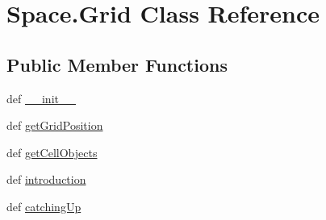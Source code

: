 \hypertarget{classSpace_1_1Grid}{\section{\-Space.\-Grid \-Class \-Reference}
\label{classSpace_1_1Grid}
}
\subsection*{\-Public \-Member \-Functions}
\begin{DoxyCompactItemize}
\item 
def \hyperlink{classSpace_1_1Grid_a685e4522685becf245a520a6e669509f}{\-\_\-\-\_\-init\-\_\-\-\_\-}
\item 
def \hyperlink{classSpace_1_1Grid_afd730a4c95125ce048ddebc1105deddb}{get\-Grid\-Position}
\item 
def \hyperlink{classSpace_1_1Grid_a5bd13dd073fa6572ec88e9ed77667a8c}{get\-Cell\-Objects}
\item 
def \hyperlink{classSpace_1_1Grid_a4675a685e2e94a8cdb9c6a9ad212b7aa}{introduction}
\item 
def \hyperlink{classSpace_1_1Grid_ae401c7c3424bb6e53ed54d91b1a5e552}{catching\-Up}
\end{DoxyCompactItemize}
